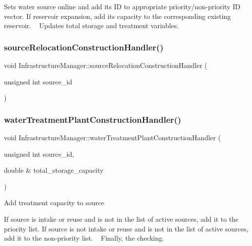 Sets water source online and add its ID to appropriate priority/non-\/priority ID vector. If reservoir expansion, add its capacity to the corresponding existing reservoir. ~\newline
 Updates total storage and treatment variables. \mbox{\label{classInfrastructureManager_a1eb260820a0127294d18d160cb146db9}} 
\subsubsection{\texorpdfstring{source\+Relocation\+Construction\+Handler()}{sourceRelocationConstructionHandler()}}
{\footnotesize\ttfamily void Infrastructure\+Manager\+::source\+Relocation\+Construction\+Handler (\begin{DoxyParamCaption}\item[{unsigned int}]{source\+\_\+id }\end{DoxyParamCaption})}

\mbox{\label{classInfrastructureManager_ad40c7049e76f7d097f1dd066c84d5c79}} 
\subsubsection{\texorpdfstring{water\+Treatment\+Plant\+Construction\+Handler()}{waterTreatmentPlantConstructionHandler()}}
{\footnotesize\ttfamily void Infrastructure\+Manager\+::water\+Treatment\+Plant\+Construction\+Handler (\begin{DoxyParamCaption}\item[{unsigned int}]{source\+\_\+id,  }\item[{double \&}]{total\+\_\+storage\+\_\+capacity }\end{DoxyParamCaption})}

Add treatment capacity to source

If source is intake or reuse and is not in the list of active sources, add it to the priority list. If source is not intake or reuse and is not in the list of active sources, add it to the non-\/priority list. ~\newline
 Finally, the checking. 

